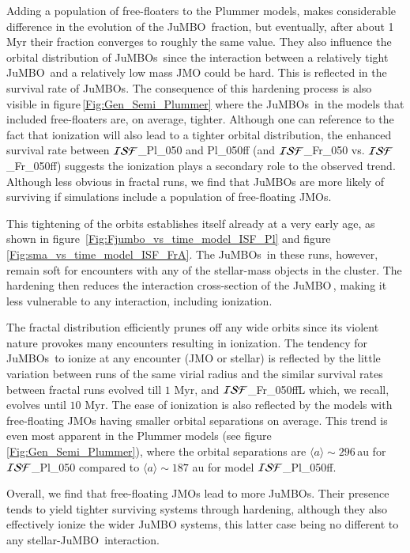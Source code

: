 \documentclass[submission,phys]{lib/SciPost}
\newcommand{\jumbo}{\mbox{JuMBO}}
\newcommand{\jumbos}{\mbox{JuMBOs}}
\begin{document}
Adding a population of free-floaters to the Plummer models, makes
considerable difference in the evolution of the \jumbo\, fraction, but
eventually, after about 1\,Myr their fraction converges to roughly the
same value.  They also influence the orbital distribution of \jumbos\,
since the interaction between a relatively tight \jumbo\, and a
relatively low mass JMO could be hard.
This is reflected in the survival rate of \jumbos. The
consequence of this hardening process is also visible in
figure\,\ref{Fig:Gen_Semi_Plummer} where the \jumbos\, in the models
that included free-floaters are, on average, tighter. Although one can
reference to the fact that ionization will also lead to a tighter
orbital distribution, the enhanced survival rate between ${\cal ISF}$\_Pl\_050 and
Pl\_050ff (and ${\cal ISF}$\_Fr\_050 vs.  ${\cal ISF}$\_Fr\_050ff) suggests the ionization plays a
secondary role to the observed trend.  Although less obvious in
fractal runs, we find that JuMBOs are more likely of surviving if
simulations include a population of free-floating JMOs.

This tightening of the orbits establishes itself already at a very early age, as shown in figure\, \ref{Fig:Fjumbo_vs_time_model_ISF_Pl} and figure 
\ref{Fig:sma_vs_time_model_ISF_FrA}.  The \jumbos\,
in these runs, however, remain soft for encounters with any of the
stellar-mass objects in the cluster. The hardening then reduces the
interaction cross-section of the \jumbo\,, making it less vulnerable
to any interaction, including ionization.

The fractal distribution efficiently prunes off any wide orbits since
its violent nature provokes many encounters resulting in
ionization. The tendency for \jumbos\, to ionize at any encounter (JMO
or stellar) is reflected by the little variation between runs of the
same virial radius and the similar survival rates between fractal runs
evolved till $1$ Myr, and ${\cal ISF}$\_Fr\_050ffL which, we recall, evolves until
$10$ Myr.  The ease of ionization is also reflected by the models with
free-floating JMOs having smaller orbital separations on average.
This trend is even most apparent in the Plummer models (see
figure\,\ref{Fig:Gen_Semi_Plummer}), where the orbital separations are
$\langle a\rangle\sim296$\,au for ${\cal ISF}$\_Pl\_050 compared to $\langle
a\rangle\sim187$ au for model ${\cal ISF}$\_Pl\_050ff.

Overall, we find that free-floating JMOs lead to more \jumbos.  Their
presence tends to yield tighter surviving systems through hardening,
although they also effectively ionize the wider JuMBO systems, this
latter case being no different to any stellar-\jumbo\ interaction.
\end{document}
